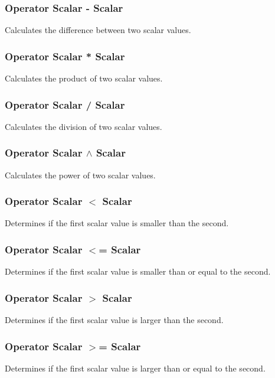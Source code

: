 \documentclass[10pt]{book}
\begin{document}
\subsubsection{Operator Scalar - Scalar \label{O:Scalar-Scalar}}
Calculates the difference between two scalar values.

\subsubsection{Operator Scalar * Scalar \label{O:Scalar*Scalar}}
Calculates the product of two scalar values.

\subsubsection{Operator Scalar / Scalar \label{O:Scalar/Scalar}}
Calculates the division of two scalar values.

\subsubsection{Operator Scalar $\wedge$ Scalar \label{O:Scalar^Scalar}}
Calculates the power of two scalar values.

\subsubsection{Operator Scalar $<$ Scalar \label{O:Scalar<Scalar}}
Determines if the first scalar value is smaller than the second.

\subsubsection{Operator Scalar $<$= Scalar \label{O:Scalar<=Scalar}}
Determines if the first scalar value is smaller than or equal to the second.

\subsubsection{Operator Scalar $>$ Scalar \label{O:Scalar>Scalar}}
Determines if the first scalar value is larger than the second.

\subsubsection{Operator Scalar $>$= Scalar \label{O:Scalar>=Scalar}}
Determines if the first scalar value is larger than or equal to the second.
\end{document}
